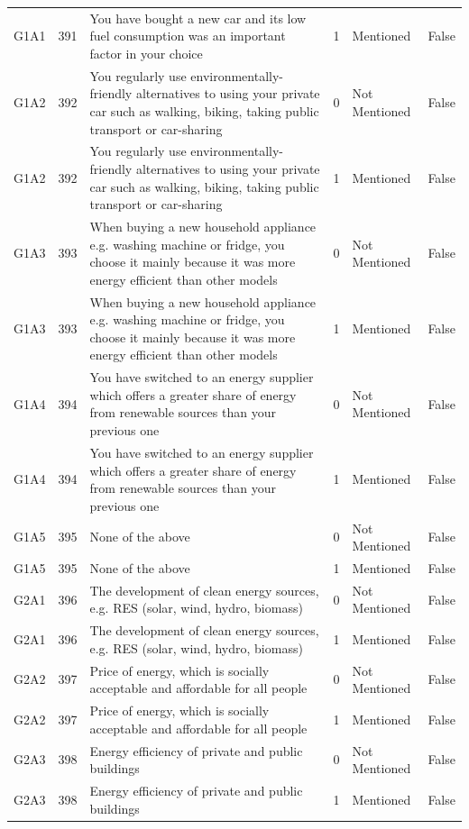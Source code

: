 \begin{tabular}{lrlllr}
G1A1 & 391 & You have bought a new car and its low fuel consumption was an important factor in your choice & 1 & Mentioned & False \\
G1A2 & 392 & You regularly use environmentally-friendly alternatives to using your private car such as walking, biking, taking public transport or car-sharing & 0 & Not Mentioned & False \\
G1A2 & 392 & You regularly use environmentally-friendly alternatives to using your private car such as walking, biking, taking public transport or car-sharing & 1 & Mentioned & False \\
G1A3 & 393 & When buying a new household appliance e.g. washing machine or fridge, you choose it mainly because it was more energy efficient than other models & 0 & Not Mentioned & False \\
G1A3 & 393 & When buying a new household appliance e.g. washing machine or fridge, you choose it mainly because it was more energy efficient than other models & 1 & Mentioned & False \\
G1A4 & 394 & You have switched to an energy supplier which offers a greater share of energy from renewable sources than your previous one   & 0 & Not Mentioned & False \\
G1A4 & 394 & You have switched to an energy supplier which offers a greater share of energy from renewable sources than your previous one   & 1 & Mentioned & False \\
G1A5 & 395 & None of the above & 0 & Not Mentioned & False \\
G1A5 & 395 & None of the above & 1 & Mentioned & False \\
G2A1 & 396 & The development of clean energy sources, e.g. RES (solar, wind, hydro, biomass) & 0 & Not Mentioned & False \\
G2A1 & 396 & The development of clean energy sources, e.g. RES (solar, wind, hydro, biomass) & 1 & Mentioned & False \\
G2A2 & 397 & Price of energy, which is socially acceptable and affordable for all people & 0 & Not Mentioned & False \\
G2A2 & 397 & Price of energy, which is socially acceptable and affordable for all people & 1 & Mentioned & False \\
G2A3 & 398 & Energy efficiency of private and public buildings & 0 & Not Mentioned & False \\
G2A3 & 398 & Energy efficiency of private and public buildings & 1 & Mentioned & False \\

\end{tabular}
